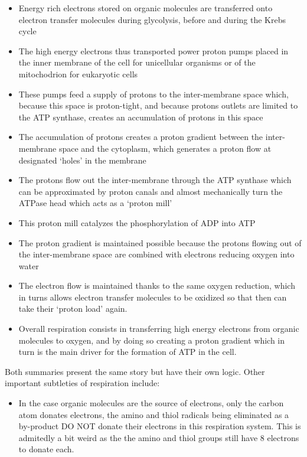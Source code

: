 \documentclass[]{book}
\providecommand{\tightlist}{%
  \setlength{\itemsep}{0pt}\setlength{\parskip}{0pt}}
\theoremstyle{definition}
\theoremstyle{definition}
\theoremstyle{definition}
\theoremstyle{remark}
\begin{document}
\begin{itemize}
\tightlist
\item
  Energy rich electrons stored on organic molecules are transferred onto
  electron transfer molecules during glycolysis, before and during the
  Krebs cycle
\item
  The high energy electrons thus transported power proton pumps placed
  in the inner membrane of the cell for unicellular organisms or of the
  mitochodrion for eukaryotic cells
\item
  These pumps feed a supply of protons to the inter-membrane space
  which, because this space is proton-tight, and because protons outlets
  are limited to the ATP synthase, creates an accumulation of protons in
  this space
\item
  The accumulation of protons creates a proton gradient between the
  inter-membrane space and the cytoplasm, which generates a proton flow
  at designated `holes' in the membrane
\item
  The protons flow out the inter-membrane through the ATP synthase which
  can be approximated by proton canals and almost mechanically turn the
  ATPase head which acts as a `proton mill'
\item
  This proton mill catalyzes the phosphorylation of ADP into ATP
\item
  The proton gradient is maintained possible because the protons flowing
  out of the inter-membrane space are combined with electrons reducing
  oxygen into water
\item
  The electron flow is maintained thanks to the same oxygen reduction,
  which in turns allows electron transfer molecules to be oxidized so
  that then can take their `proton load' again.
\item
  Overall respiration consists in transferring high energy electrons
  from organic molecules to oxygen, and by doing so creating a proton
  gradient which in turn is the main driver for the formation of ATP in
  the cell.
\end{itemize}

Both summaries present the same story but have their own logic. Other
important subtleties of respiration include:

\begin{itemize}
\tightlist
\item
  In the case organic molecules are the source of electrons, only the
  carbon atom donates electrons, the amino and thiol radicals being
  eliminated as a by-product DO NOT donate their electrons in this
  respiration system. This is admitedly a bit weird as the the amino and
  thiol groups still have 8 electrons to donate each.
\end{itemize}
\end{document}
